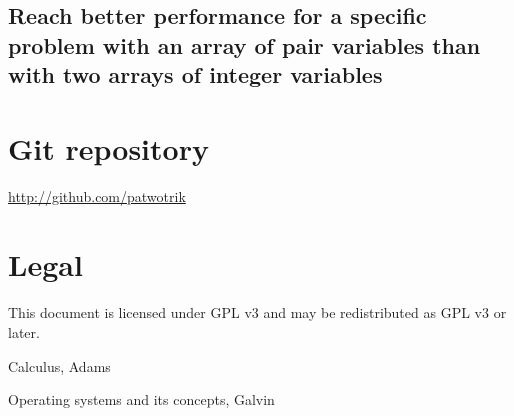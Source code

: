 \documentclass[a4paper,11pt]{article}
\begin{document}
\subsection{Reach better performance for a specific problem with an array of pair variables than with two arrays of integer variables}

\section{Git repository}
\url{http://github.com/patwotrik}

\section{Legal}
This document is licensed under GPL v3 and may be redistributed as GPL v3 or later. 

\begin{thebibliography}{99}
	Calculus, 
	Adams
	
	Operating systems and its concepts,
	Galvin
	
\end{thebibliography}
\end{document}
